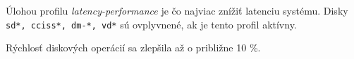Úlohou profilu \emph{latency-performance} je čo najviac znížiť latenciu
systému. Disky \texttt{sd*, cciss*, dm-*, vd*} sú ovplyvnené, ak je tento
profil aktívny. 

Rýchlosť diskových operácií sa zlepšila až o približne 10 \%.
